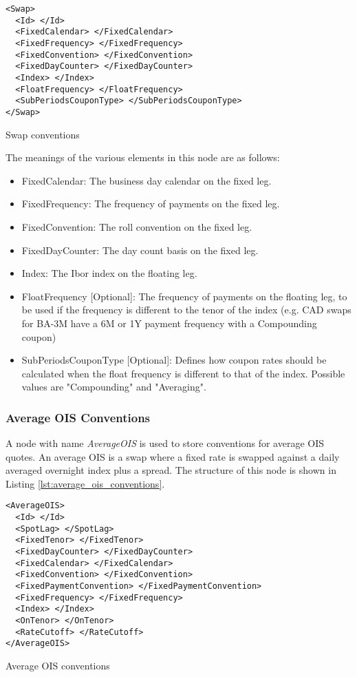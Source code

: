 \begin{listing}[H]
\begin{verbatim}
<Swap>
  <Id> </Id>
  <FixedCalendar> </FixedCalendar>
  <FixedFrequency> </FixedFrequency>
  <FixedConvention> </FixedConvention>
  <FixedDayCounter> </FixedDayCounter>
  <Index> </Index>
  <FloatFrequency> </FloatFrequency>
  <SubPeriodsCouponType> </SubPeriodsCouponType>
</Swap>
\end{verbatim}
\caption{Swap conventions}
\label{lst:swap_conventions}
\end{listing}

The meanings of the various elements in this node are as follows:
\begin{itemize}
\item FixedCalendar: The business day calendar on the fixed leg.
\item FixedFrequency: The frequency of payments on the fixed leg.
\item FixedConvention: The roll convention on the fixed leg.
\item FixedDayCounter: The day count basis on the fixed leg.
\item Index: The Ibor index on the floating leg.
\item FloatFrequency [Optional]: The frequency of payments on the floating leg, to be used if the frequency is different to the tenor of the index (e.g. CAD swaps for BA-3M have a 6M or 1Y payment frequency with a Compounding coupon)
\item SubPeriodsCouponType [Optional]: Defines how coupon rates should be calculated when the float frequency is different to that of the index. Possible values are "Compounding" and "Averaging".
\end{itemize}

\subsubsection{Average OIS Conventions}
A node with name \emph{AverageOIS} is used to store conventions for average OIS quotes. An average OIS is a swap where a
fixed rate is swapped against a daily averaged overnight index plus a spread. The structure of this node is shown in
Listing \ref{lst:average_ois_conventions}.

\begin{listing}[H]
\begin{verbatim}
<AverageOIS>
  <Id> </Id>
  <SpotLag> </SpotLag>
  <FixedTenor> </FixedTenor>
  <FixedDayCounter> </FixedDayCounter>
  <FixedCalendar> </FixedCalendar>
  <FixedConvention> </FixedConvention>
  <FixedPaymentConvention> </FixedPaymentConvention>
  <FixedFrequency> </FixedFrequency>
  <Index> </Index>
  <OnTenor> </OnTenor>
  <RateCutoff> </RateCutoff>
</AverageOIS>
\end{verbatim}
\caption{Average OIS conventions}
\label{lst:average_ois_conventions}
\end{listing}


